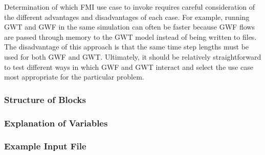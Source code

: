 \noindent Determination of which FMI use case to invoke requires careful consideration of the different advantages and disadvantages of each case.  For example, running GWT and GWF in the same simulation can often be faster because GWF flows are passed through memory to the GWT model instead of being written to files.  The disadvantage of this approach is that the same time step lengths must be used for both GWF and GWT.  Ultimately, it should be relatively straightforward to test different ways in which GWF and GWT interact and select the use case most appropriate for the particular problem. 

\vspace{5mm}
\subsubsection{Structure of Blocks}



\vspace{5mm}
\subsubsection{Explanation of Variables}
\begin{description}

\end{description}

\vspace{5mm}
\subsubsection{Example Input File}


